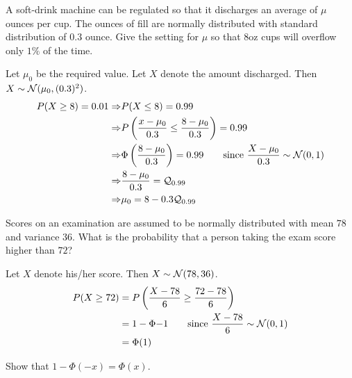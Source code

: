 \begin{example}
A soft-drink machine can be regulated so that it discharges an average of
$\mu$ ounces per cup. The ounces of fill are normally distributed with standard
distribution of $0.3$ ounce. Give the setting for $\mu$ so that $8$oz cups will
overflow only $1\%$ of the time.
\end{example}
\begin{solution}
Let $\mu_0$ be the required value. Let $X$ denote the amount discharged. Then
$X \sim \mathcal{N}(\mu_0, (0.3)^2)$. 
\begin{align*}
    P(X \geq 8) = 0.01 \Rightarrow & P(X \leq 8) = 0.99                    \\
    \Rightarrow & P \left(
        \frac{x - \mu_0}{0.3} \leq \frac{8 - \mu_0}{0.3}
    \right) = 0.99                                                         \\
    \Rightarrow & \Phi \left( \frac{8 - \mu_0}{0.3} \right) = 0.99 
        \qquad \text{since } \frac{X - \mu_0}{0.3} \sim \mathcal{N}(0, 1)  \\
    \Rightarrow & \frac{8 - \mu_0}{0.3} = \mathcal{Q}_{0.99}               \\
    \Rightarrow & \mu_0 = 8 - 0.3 \mathcal{Q}_{0.99}
\end{align*}
\end{solution}

\begin{example}
Scores on an examination are assumed to be normally distributed with mean $78$
and variance $36$. What is the probability that a person taking the exam score
higher than $72$?
\end{example}
\begin{solution}
Let $X$ denote his/her score. Then $X \sim \mathcal{N}(78, 36)$.
\begin{align*}
    P(X \geq 72) &= P \left(
                        \frac{X - 78}{6} \geq \frac{72 - 78}{6}
                    \right)                                                \\
                 &= 1 - \Phi{-1} \qquad 
                    \text{since } \frac{X - 78}{6} \sim \mathcal{N}(0, 1)  \\
                 &= \Phi(1) 
\end{align*}
\end{solution}

\begin{example}
Show that $1 - \Phi(-x) = \Phi(x)$.
\end{example}
